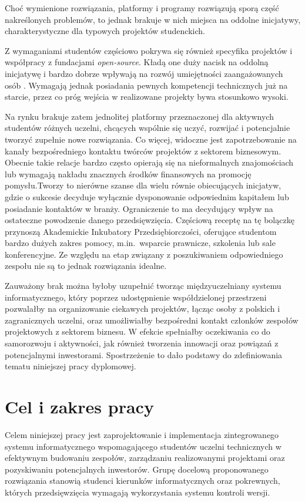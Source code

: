 Choć wymienione rozwiązania, platformy i programy rozwiązują sporą część nakreślonych problemów, to jednak brakuje w nich miejsca na oddolne inicjatywy, charakterystyczne dla typowych projektów studenckich.

Z wymaganiami studentów częściowo pokrywa się również specyfika projektów i współpracy z fundacjami \emph{open-source}. Kładą one duży nacisk na oddolną inicjatywę i bardzo dobrze wpływają na rozwój umiejętności zaangażowanych osób \cite{Pinto2019}. Wymagają jednak posiadania pewnych kompetencji technicznych już na starcie, przez co próg wejścia w realizowane projekty bywa stosunkowo wysoki. 

Na rynku brakuje zatem jednolitej platformy przeznaczonej dla aktywnych studentów różnych uczelni, chcących wspólnie się uczyć, rozwijać i potencjalnie tworzyć zupełnie nowe rozwiązania. Co więcej, widoczne jest zapotrzebowanie na kanały bezpośredniego kontaktu twórców projektów z sektorem biznesowym. Obecnie takie relacje bardzo często opierają się na nieformalnych znajomościach lub wymagają nakładu znacznych środków finansowych na promocję pomysłu.Tworzy to nierówne szanse dla wielu równie obiecujących inicjatyw, gdzie o sukcesie decyduje wyłącznie dysponowanie odpowiednim kapitałem lub posiadanie kontaktów w branży. Ograniczenie to ma decydujący wpływ na ostateczne powodzenie danego przedsięwzięcia. Częściową receptę na tę bolączkę przynoszą Akademickie Inkubatory Przedsiębiorczości, oferujące studentom bardzo dużych zakres pomocy, m.in.\ wsparcie prawnicze, szkolenia lub sale konferencyjne. Ze względu na etap związany z poszukiwaniem odpowiedniego zespołu nie są to jednak rozwiązania idealne.

Zauważony brak można byłoby uzupełnić tworząc międzyuczelniany systemu informatycznego, który poprzez udostępnienie współdzielonej przestrzeni pozwalałby na organizowanie ciekawych projektów, łącząc osoby z polskich i zagranicznych uczelni, oraz umożliwiałby bezpośredni kontakt członków zespołów projektowych z sektorem biznesu. W efekcie spełniałby oczekiwania co do samorozwoju i aktywności, jak również tworzenia innowacji oraz powiązań z potencjalnymi inwestorami. Spostrzeżenie to dało podstawy do zdefiniowania tematu niniejszej pracy dyplomowej.


\section{Cel i zakres pracy}
Celem niniejszej pracy jest zaprojektowanie i implementacja zintegrowanego systemu informatycznego wspomagającego studentów uczelni technicznych w efektywnym budowaniu zespołów, zarządzaniu realizowanymi projektami oraz pozyskiwaniu potencjalnych inwestorów.
Grupę docelową proponowanego rozwiązania stanowią studenci kierunków informatycznych oraz pokrewnych, których przedsięwzięcia wymagają wykorzystania systemu kontroli wersji.

